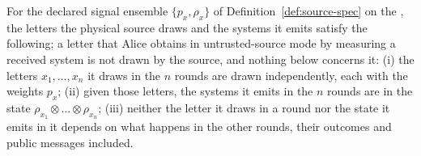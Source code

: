 \begin{assumption}
\label{ass:ens}
For the declared signal ensemble $\{p_x,\rho_x\}$ of
Definition~\ref{def:source-spec} on the , the
letters the physical source draws and the systems it emits satisfy the
following; a letter that Alice obtains in untrusted-source mode by measuring a
received system is not drawn by the source, and nothing below concerns it:
(i) the letters $x_1,\dots,x_n$ it draws in the $n$ rounds are drawn
independently, each with the weights $p_x$;
(ii) given those letters, the systems it emits in the $n$ rounds are in the
state $\rho_{x_1}\otimes\dots\otimes\rho_{x_n}$;
(iii) neither the letter it draws in a round nor the state it emits in it
depends on what happens in the other rounds, their outcomes and public
messages included.
\end{assumption}
